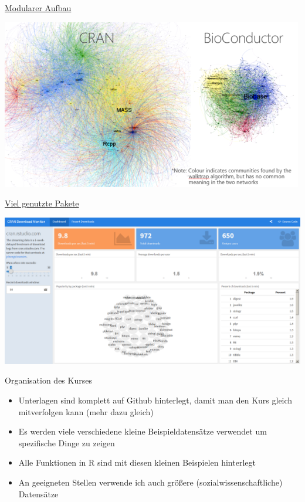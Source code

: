\documentclass[ignorenonframetext,]{beamer}
\providecommand{\tightlist}{%
\setlength{\itemsep}{0pt}\setlength{\parskip}{0pt}}
\begin{document}
\begin{frame}{\href{http://stats.idre.ucla.edu/r/seminars/intro/}{Modularer
Aufbau}}

\includegraphics{./tex2pdf.956/52aa3feffd0fea76fab89e494b422bd484e53778.png}

\end{frame}

\begin{frame}{\href{https://gallery.shinyapps.io/cran-gauge/}{Viel
genutzte Pakete}}

\includegraphics{./tex2pdf.956/a853199d8c52109309acb7b49e363481b04e7192.png}

\end{frame}

\begin{frame}{Organisation des Kurses}

\begin{itemize}
\tightlist
\item
  Unterlagen sind komplett auf Github hinterlegt, damit man den Kurs
  gleich mitverfolgen kann (mehr dazu gleich)
\item
  Es werden viele verschiedene kleine Beispieldatensätze verwendet um
  spezifische Dinge zu zeigen
\item
  Alle Funktionen in R sind mit diesen kleinen Beispielen hinterlegt
\item
  An geeigneten Stellen verwende ich auch größere
  (sozialwissenschaftliche) Datensätze
\end{itemize}

\end{frame}
\end{document}
